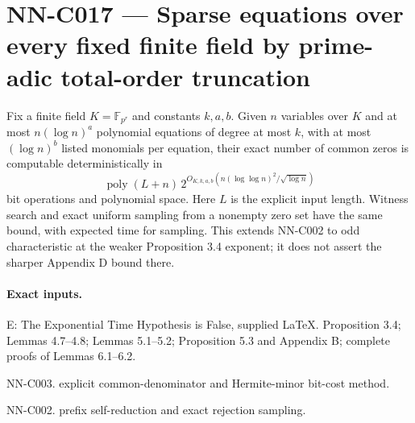 \section{NN-C017 --- Sparse equations over every fixed finite field by prime-adic total-order truncation}
\begin{proposition}[NN-C017]
Fix a finite field $K=\mathbb F_{p^r}$ and constants $k,a,b$. Given $n$ variables over $K$ and at most $n(\log n)^a$ polynomial equations of degree at most $k$, with at most $(\log n)^b$ listed monomials per equation, their exact number of common zeros is computable deterministically in
\[
 \operatorname{poly}(L+n)\,
 2^{O_{K,k,a,b}(n(\log\log n)^2/\sqrt{\log n})}
\]
bit operations and polynomial space. Here $L$ is the explicit input length. Witness search and exact uniform sampling from a nonempty zero set have the same bound, with expected time for sampling. This extends NN-C002 to odd characteristic at the weaker Proposition 3.4 exponent; it does not assert the sharper Appendix D bound there.
\end{proposition}
\paragraph{Exact inputs.}
E: The Exponential Time Hypothesis is False, supplied LaTeX. Proposition 3.4; Lemmas 4.7--4.8; Lemmas 5.1--5.2; Proposition 5.3 and Appendix B; complete proofs of Lemmas 6.1--6.2.

NN-C003. explicit common-denominator and Hermite-minor bit-cost method.

NN-C002. prefix self-reduction and exact rejection sampling.

